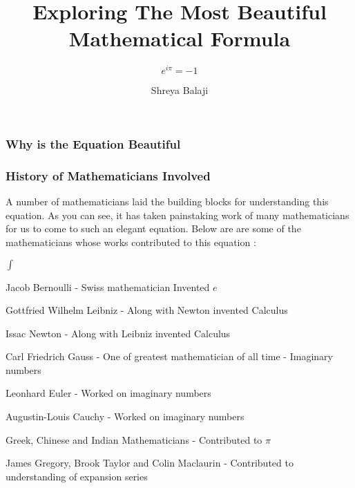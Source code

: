 \documentclass[10pt]{beamer}
\begin{document}
\author{Shreya Balaji}
\title{Exploring The Most Beautiful Mathematical Formula}
\subtitle{\huge\(e^{i \pi} = -1\)}
\begin{frame}[plain]
	\maketitle
\end{frame}

\begin{frame}
	\frametitle{Why is the Equation Beautiful}
\end{frame}

\begin{frame}
	\frametitle{ History of Mathematicians Involved}

	A number of mathematicians laid the building blocks for understanding this equation.  As you can see, it has taken painstaking work of many mathematicians for us to come to such an elegant equation. Below are are some of the mathematicians whose works contributed to this equation :
	\vspace{7pt}

	\begin{list}{$\int$}{}
		\item Jacob Bernoulli - Swiss mathematician Invented $e$
		\item  Gottfried Wilhelm Leibniz  - Along with Newton invented Calculus
		\item Issac Newton - Along with Leibniz invented Calculus
		\item Carl Friedrich Gauss - One of  greatest mathematician of all time - Imaginary numbers
		\item Leonhard Euler - Worked on imaginary numbers
		\item Augustin-Louis Cauchy - Worked on imaginary numbers
		\item Greek, Chinese and Indian Mathematicians - Contributed to $\pi$
		\item James Gregory, Brook Taylor and Colin Maclaurin - Contributed to understanding of expansion series
	\end{list}

\end{frame}
\end{document}
